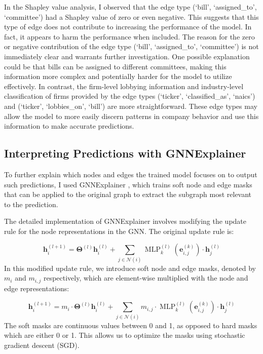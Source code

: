 \documentclass[15pt,letterpaper]{article}
\begin{document}
In the Shapley value analysis, I observed that the edge type (`bill', `assigned\_to', `committee') had a Shapley value of zero or even negative. This suggests that this type of edge does not contribute to increasing the performance of the model. In fact, it appears to harm the performance when included.
The reason for the zero or negative contribution of the edge type (`bill', `assigned\_to', `committee') is not immediately clear and warrants further investigation. 
One possible explanation could be that bills can be assigned to different committees, making this information more complex and potentially harder for the model to utilize effectively. 
In contrast, the firm-level lobbying information and industry-level classification of firms provided by the edge types (`ticker', `classified\_as', `naics') and (`ticker', `lobbies\_on', `bill') are more straightforward. These edge types may allow the model to more easily discern patterns in company behavior and use this information to make accurate predictions.

\subsection{Interpreting Predictions with GNNExplainer\protect\footnotemark}

To further explain which nodes and edges the trained model focuses on to output such predictions, I used GNNExplainer \citep{gex}, which trains soft node and edge masks that can be applied to the original graph to extract the subgraph most relevant to the prediction.

The detailed implementation of GNNExplainer involves modifying the update rule for the node representations in the GNN. The original update rule is:

$$
\mathbf{h}_i^{(l+1)}=\boldsymbol{\Theta}^{(l)} \mathbf{h}_i^{(l)}+\sum_{j \in \mathcal{N}(i)} \operatorname{MLP}_k^{(l)}\left(\mathbf{e}_{i, j}^{(k)}\right) \cdot \mathbf{h}_j^{(l)}
$$
In this modified update rule, we introduce soft node and edge masks, denoted by $m_i$ and $m_{i,j}$ respectively, which are element-wise multiplied with the node and edge representations:

$$
\mathbf{h}_i^{(l+1)}=m_i \cdot \boldsymbol{\Theta}^{(l)} \mathbf{h}_i^{(l)}+\sum_{j \in \mathcal{N}(i)} m_{i, j} \cdot \operatorname{MLP}_k^{(l)}\left(\mathbf{e}_{i, j}^{(k)}\right) \cdot \mathbf{h}_j^{(l)}
$$
The soft masks are continuous values between 0 and 1, as opposed to hard masks which are either 0 or 1. This allows us to optimize the masks using stochastic gradient descent (SGD).
\end{document}
